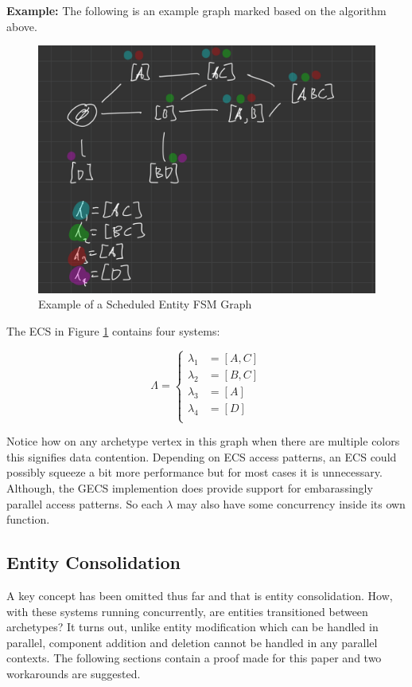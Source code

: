 \textbf{Example:} The following is an example graph marked based on the algorithm above.

\begin{figure}[H]
    \centering
    \includegraphics[width=0.5\linewidth]{resources/graph2.png}
    \caption{Example of a Scheduled Entity FSM Graph}
    \label{fig:graph2}
\end{figure}

The ECS in Figure \ref{fig:graph2} contains four systems: 

\begin{equation*}
    \Lambda = \begin{cases}
        \lambda_1 &= [A,C] \\
        \lambda_2 &= [B,C] \\ 
        \lambda_3 &= [A] \\ 
        \lambda_4 &= [D] \\ 
    \end{cases}
\end{equation*}

Notice how on any archetype vertex in this graph when there are multiple colors this signifies data contention. Depending on ECS access patterns, an ECS could possibly squeeze a bit more performance but for most cases it is unnecessary. Although, the GECS implemention does provide support for embarassingly parallel access patterns. So each $\lambda$ may also have some concurrency inside its own function.

\subsection{Entity Consolidation}
A key concept has been omitted thus far and that is entity consolidation. How, with these systems running concurrently, are entities transitioned between archetypes? It turns out, unlike entity modification which can be handled in parallel, component addition and deletion cannot be handled in any parallel contexts. The following sections contain a proof made for this paper and two workarounds are suggested.

